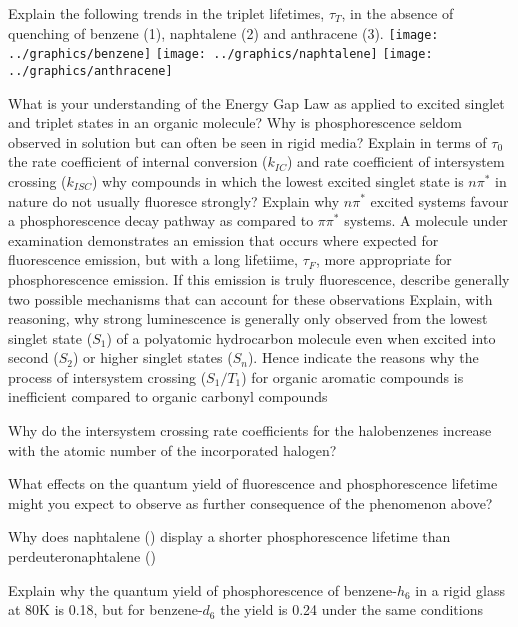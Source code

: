 \documentclass[ignorenonframetext]{beamer}
\begin{document}
\begin{ExerciseList}
\Exercise 
\Question Explain the following trends in the triplet lifetimes, \(\tau_T\), in the absence of quenching of benzene (1), naphtalene (2) and anthracene (3).\newline
\texttt{[image: ../graphics/benzene]} \hspace{1cm} \texttt{[image: ../graphics/naphtalene]} \hspace{1cm} \texttt{[image: ../graphics/anthracene]}\newline

\Question What is your understanding of the Energy Gap Law as applied to excited singlet and triplet states in an organic molecule?
\Question Why is phosphorescence seldom observed in solution but can often be seen in rigid media?
\Question Explain in terms of \(\tau_0\) the rate coefficient of internal conversion (\(k_{IC}\)) and rate coefficient of intersystem crossing (\(k_{ISC}\)) why compounds in which the lowest excited singlet state is \(n\pi^*\) in nature do not usually fluoresce strongly?
\Question Explain why \(n\pi^*\) excited systems favour a phosphorescence decay pathway as compared to \(\pi\pi^*\) systems.
\Question A molecule under examination demonstrates an emission that occurs where expected for fluorescence emission, but with a long lifetiime, \(\tau_F\), more appropriate for phosphorescence emission. If this emission is truly fluorescence, describe generally two possible mechanisms that can account for these observations
\Question Explain, with reasoning, why strong luminescence is generally only observed from the lowest singlet state (\(S_1\)) of a polyatomic hydrocarbon molecule even when excited into second (\(S_2\)) or higher singlet states (\(S_n\)). Hence indicate the reasons why the process of intersystem crossing (\(S_1/T_1\)) for organic aromatic compounds is inefficient compared to organic carbonyl compounds

\Exercise Why do the intersystem crossing rate coefficients for the halobenzenes increase with the atomic number of the incorporated halogen?

\Exercise What effects on the quantum yield of fluorescence and phosphorescence lifetime might you expect to observe as further consequence of the phenomenon above?

\Exercise Why does naphtalene () display a shorter phosphorescence lifetime than perdeuteronaphtalene ()

\Exercise Explain why the quantum yield of phosphorescence of benzene-\(h_6\) in a rigid glass at 80K is 0.18, but for benzene-\(d_6\) the yield is 0.24 under the same conditions


\end{ExerciseList}
\end{document}
